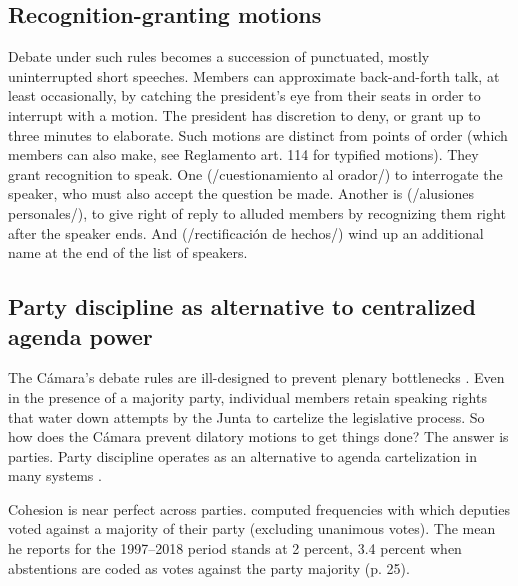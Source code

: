 \documentclass[letter,12pt]{article}
\begin{document}
  \subsection{Recognition-granting motions}
Debate under such rules becomes a succession of punctuated, mostly uninterrupted short speeches. Members can approximate back-and-forth talk, at least occasionally, by catching the president's eye from their seats in order to interrupt with a motion. The president has discretion to deny, or grant up to three minutes to elaborate. Such motions are distinct from points of order (which members can also make, see Reglamento art. 114 for typified motions). They grant recognition to speak. One (/cuestionamiento al orador/) to interrogate the speaker, who must also accept the question be made. Another is (/alusiones personales/), to give right of reply to alluded members by recognizing them right after the speaker ends. And (/rectificación de hechos/) wind up an additional name at the end of the list of speakers. 

  \subsection{Party discipline as alternative to centralized agenda power}
The Cámara's debate rules are ill-designed to prevent plenary bottlenecks \citep{cox.2006}. Even in the presence of a majority party, individual members retain speaking rights that water down attempts by the Junta to cartelize the legislative process. So how does the Cámara prevent dilatory motions to get things done? The answer is parties. Party discipline operates as an alternative to agenda cartelization in many systems \citep{prata.2006}. 

Cohesion is near perfect across parties. \citet{tellez-del-rio.2018} computed frequencies with which deputies voted against a majority of their party (excluding unanimous votes). The mean he reports for the 1997--2018 period stands at 2 percent, 3.4 percent when abstentions are coded as votes against the party majority (p. 25). 
\end{document}
